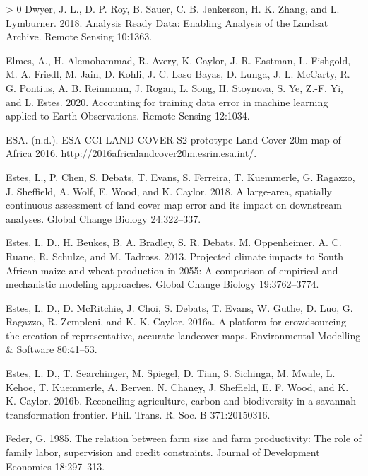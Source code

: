 \documentclass[11pt,a4paper]{article}
\newlength{\cslhangindent}
\newenvironment{CSLReferences}[3] %
 {%
  \setlength{\parindent}{0pt}
  \ifodd #1 \everypar{\setlength{\hangindent}{\cslhangindent}}\ignorespaces\fi
  \ifnum #2 > 0
  \setlength{\parskip}{#2\baselineskip}
  \fi
 }%
 {}
\begin{document}
\begin{CSLReferences}{1}{0}
\leavevmode\hypertarget{ref-DwyerAnalysisReadyData2018}{}%
Dwyer, J. L., D. P. Roy, B. Sauer, C. B. Jenkerson, H. K. Zhang, and L.
Lymburner. 2018. Analysis {Ready Data}: {Enabling Analysis} of the
{Landsat Archive}. Remote Sensing 10:1363.

\leavevmode\hypertarget{ref-ElmesAccountingtrainingdata2020}{}%
Elmes, A., H. Alemohammad, R. Avery, K. Caylor, J. R. Eastman, L.
Fishgold, M. A. Friedl, M. Jain, D. Kohli, J. C. Laso Bayas, D. Lunga,
J. L. McCarty, R. G. Pontius, A. B. Reinmann, J. Rogan, L. Song, H.
Stoynova, S. Ye, Z.-F. Yi, and L. Estes. 2020. Accounting for training
data error in machine learning applied to {Earth Observations}. Remote
Sensing 12:1034.

\leavevmode\hypertarget{ref-ESAESACCILAND}{}%
ESA. (n.d.). {ESA CCI LAND COVER} {} {S2} prototype {Land Cover} 20m map
of {Africa} 2016. http://2016africalandcover20m.esrin.esa.int/.

\leavevmode\hypertarget{ref-Esteslargeareaspatiallycontinuous2018}{}%
Estes, L., P. Chen, S. Debats, T. Evans, S. Ferreira, T. Kuemmerle, G.
Ragazzo, J. Sheffield, A. Wolf, E. Wood, and K. Caylor. 2018. A
large-area, spatially continuous assessment of land cover map error and
its impact on downstream analyses. Global Change Biology 24:322--337.

\leavevmode\hypertarget{ref-EstesProjectedclimateimpacts2013}{}%
Estes, L. D., H. Beukes, B. A. Bradley, S. R. Debats, M. Oppenheimer, A.
C. Ruane, R. Schulze, and M. Tadross. 2013. Projected climate impacts to
{South African} maize and wheat production in 2055: A comparison of
empirical and mechanistic modeling approaches. Global Change Biology
19:3762--3774.

\leavevmode\hypertarget{ref-Estesplatformcrowdsourcingcreation2016}{}%
Estes, L. D., D. McRitchie, J. Choi, S. Debats, T. Evans, W. Guthe, D.
Luo, G. Ragazzo, R. Zempleni, and K. K. Caylor. 2016a. A platform for
crowdsourcing the creation of representative, accurate landcover maps.
Environmental Modelling \& Software 80:41--53.

\leavevmode\hypertarget{ref-EstesReconcilingagriculturecarbon2016}{}%
Estes, L. D., T. Searchinger, M. Spiegel, D. Tian, S. Sichinga, M.
Mwale, L. Kehoe, T. Kuemmerle, A. Berven, N. Chaney, J. Sheffield, E. F.
Wood, and K. K. Caylor. 2016b. Reconciling agriculture, carbon and
biodiversity in a savannah transformation frontier. Phil. Trans. R. Soc.
B 371:20150316.

\leavevmode\hypertarget{ref-federRelationFarmSize1985}{}%
Feder, G. 1985. The relation between farm size and farm productivity:
{The} role of family labor, supervision and credit constraints. Journal
of Development Economics 18:297--313.


\end{CSLReferences}
\end{document}
